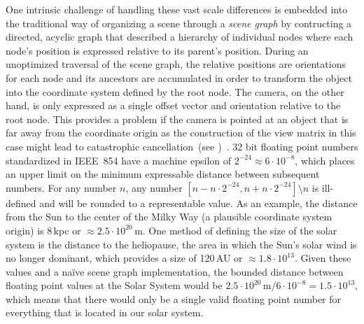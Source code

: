 One intrinsic challenge of handling these vast scale differences is embedded into the traditional way of organizing a scene through a \emph{scene graph} by contructing a directed, acyclic graph that described a hierarchy of individual nodes where each node's position is expressed relative to its parent's position.  During an unoptimized traversal of the scene graph, the relative positions are orientations for each node and its ancestors are accumulated in order to transform the object into the coordinate system defined by the root node.  The camera, on the other hand, is only expressed as a single offset vector and orientation relative to the root node.  This provides a problem if the camera is pointed at an object that is far away from the coordinate origin as the construction of the view matrix in this case might lead to catastrophic cancellation~(see )~\cite{cuyt2001remarkable}.  32 bit floating point numbers standardized in IEEE~854 have a machine epsilon of $2^{-24} \approx 6 \cdot 10^{-8}$, which places an upper limit on the minimum expressable distance between subsequent numbers.  For any number $n$, any number $\left[ n - n \cdot 2^{-24}, n + n \cdot 2^{-24}\right] \setminus{n}$ is ill-defined and will be rounded to a representable value.  As an example, the distance from the Sun to the center of the Milky Way (a plausible coordinate system origin) is 8\,kpc or $\approx 2.5 \cdot 10^{20}\,$m.  One method of defining the size of the solar system is the distance to the heliopause, the area in which the Sun's solar wind is no longer dominant, which provides a size of 120\,AU or $\approx 1.8 \cdot 10^{13}$.  Given these values and a na\"ive scene graph implementation, the bounded distance between floating point values at the Solar System would be $2.5 \cdot 10^{20}\,\textrm{m} / 6 \cdot 10^{-8} = 1.5 \cdot 10^{13}$, which means that there would only be a single valid floating point number for everything that is located in our solar system.


